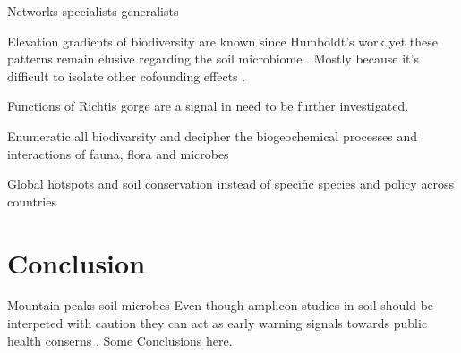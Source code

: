 \documentclass[unnumsec,webpdf,contemporary,large]{oup-authoring-template}%
\theoremstyle{thmstyleone}%
\theoremstyle{thmstyletwo}%
\theoremstyle{thmstylethree}%
\begin{document}
Networks specialists generalists \citep{Barberan2012}

Elevation gradients of biodiversity are known since Humboldt's work \citep{Rahbek2019} 
yet these patterns remain elusive regarding the soil microbiome \citep{Looby2020, Siles2023}.
Mostly because it's difficult to isolate other cofounding effects \citep{Nottingham2018}. 

Functions of Richtis gorge are a signal in need to be further investigated.

Enumeratic all biodivarsity \citep{Anthony2023} and decipher the biogeochemical 
processes and interactions of fauna, flora and microbes \citep{Fry2019, Crowther2019,GRANDY201640,Delgado-Baquerizo2020}

Global hotspots \citep{Guerra2022}
and soil conservation instead of specific species \citep{Guerra2021}
and policy \citep{KONINGER2022} across countries \citep{Putten2023}


\section{Conclusion}

Mountain peaks soil microbes \citep{Adamczyk2019}
Even though amplicon studies in soil should be interpeted with caution \citep{alteio2021} they 
can act as early warning signals towards public health conserns \citep{Banerjee2023}.
Some Conclusions here.


%
%
%
%
%
%
\end{document}
